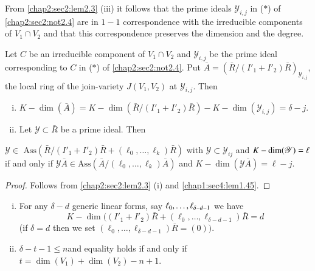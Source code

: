 \setcounter{remark}{4}
\begin{remark}\label{chap2:sec2:rem2.5}
  From \ref{chap2:sec2:lem2.3} (iii) it follows that the prime ideals
  $\mathscr{Y}_{i, j} 
  $ in ($*$) of \ref{chap2:sec2:not2.4} are in $1-1$ correspondence
  with the irreducible 
  components of $V_1 \cap V_2$ and that this correspondence preserves
  the dimension and the degree. 
\end{remark}

\setcounter{lemma}{5}
\begin{lemma}\label{chap2:sec2:lem2.6}
  Let $C$ be an irreducible component of $V_1 \cap
  V_2$ and $\mathscr{Y}_{i, j}$ be the prime ideal
  corresponding to $C$ in ($*$)  of \ref{chap2:sec2:not2.4}. Put $\bar{A} =
  (\bar{R}/(I'_1+I'_2) \bar{R})_{\mathscr{Y}_{i, j}}$, the local ring
  of the join-variety $J(V_1, V_2)$ at $\mathscr{Y}_{i, j}$. Then 
  \begin{enumerate}[(i)]
  \item $K-\dim (\bar{A}) = K-\dim (\bar{R}/ (I'_1+I'_2) \bar{R}) -
    K-\dim (\mathscr{Y}_{i, j}) = \delta - j$. 
  \item Let $\mathscr{Y} \subset \bar{R}$ be a prime ideal. Then
  \end{enumerate}
  $\mathscr{Y} \in  \text { Ass} (\bar{R}/(I'_1 + I'_2) \bar{R}+
  (\ell_0, \ldots,  \ell_k) \bar{R})$ with $\mathscr{Y} \subset
  \mathscr{Y}_{ij}$ and 
  $K-\dim (\mathscr{Y})\break = \ell $ if and only if $\mathscr{Y} \bar{A}
  \in  \text {Ass} (\bar{A}/(\ell_0, \ldots,  \ell_k) \bar{A}) $
  and $K-\dim (\mathscr{Y}\bar{A}) = \ell - j$. 
\end{lemma}

\begin{proof}%
  Follows from \ref{chap2:sec2:lem2.3} (i) and
  \ref{chap1:sec4:lem1.45}. 
\end{proof}

\setcounter{proposition}{6}
\begin{proposition}\label{chap2:sec2:prop2.7}
  \begin{enumerate}[(i)]
  \item For any $\delta - d$ generic linear forms, say $\ell_0,
    \ldots,\break \ell_{\delta-d-1}$ we have
    $$
    K-\dim ((I'_1+I'_2) \bar{R}+ (\ell_0, \ldots,  \ell_{\delta-d-1}) \bar{R} = d
    $$
    (if $\delta = d$ then we set $(\ell_0,  \ldots,  \ell_{\delta-d-1})
    \bar{R} = (0))$. 
  \item $\delta-t-1 \le n$\pageoriginale and equality holds if and only if $t = \dim
    (V_1) + \dim (V_2) - n + 1$. 
  \end{enumerate}
\end{proposition}


